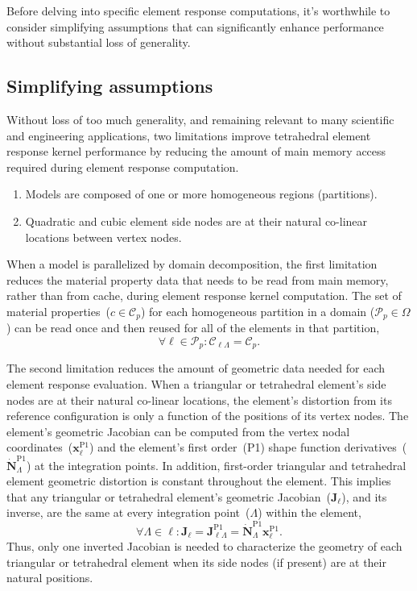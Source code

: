 \documentclass[]             %
{NASA}                       %
\begin{document}
Before delving into specific element response computations, it's worthwhile to consider simplifying assumptions that can significantly enhance performance without substantial loss of generality.

\subsection{Simplifying assumptions}

Without loss of too much generality, and remaining relevant to many scientific and engineering applications, two limitations improve tetrahedral element response kernel performance by reducing the amount of main memory access required during element response computation.
\begin{enumerate}
\item Models are composed of one or more homogeneous regions (partitions).
\item Quadratic and cubic element side nodes are at their natural co-linear locations between vertex nodes.
\end{enumerate}

When a model is parallelized by domain decomposition, the first limitation
 reduces the material property data that needs to be read from main memory,
 rather than from cache, during element response kernel computation.
 The set of material properties~($c \in \mathcal{C}_{p}$)
 for each homogeneous partition in a domain ($\mathcal{P}_{p} \in \Omega$) can
 be read once and then reused for all of the elements in that partition,
\begin{equation}
\forall\ell\in\mathcal{P}_{p}:\mathcal{C}_{\ell\Lambda} = \mathcal{C}_{p}\text{.}
\end{equation}

The second limitation reduces the amount of geometric data needed for each
 element response evaluation.
 When a triangular or tetrahedral element's side nodes are at their natural
 co-linear locations, the element's distortion from its reference configuration
 is only a function of the positions of its vertex nodes.
 The element's geometric Jacobian can be computed from the vertex nodal
 coordinates~($\mathbf{x}_{\ell}^{\mathrm{P1}}$) and the element's 
 first order~(P1) shape function derivatives~($\dot{\mathbf{N}}_{\Lambda}^{\mathrm{P1}}$)
 at the integration points.
 In addition, first-order triangular and tetrahedral element geometric distortion
 is constant throughout the element.
 This implies that any triangular or tetrahedral element's geometric
 Jacobian~($\mathbf{J}_{\ell}$), and its inverse, are the same at every 
 integration point~($\Lambda$) within the element,
\begin{equation}
\forall\Lambda\in\ell:\mathbf{J}_{\ell} = \mathbf{J}_{\ell\Lambda}^{\mathrm{P1}} = \dot{\mathbf{N}}_{\Lambda}^{\mathrm{P1}} \mathbf{x}_{\ell}^{\mathrm{P1}}\text{.}
\end{equation}
Thus, only one inverted Jacobian is needed to characterize the geometry
 of each triangular or tetrahedral element when its side nodes (if present) are at their
 natural positions.
\end{document}
